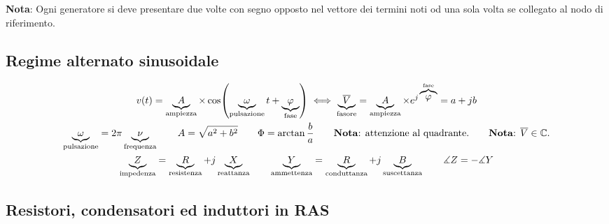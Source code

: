 \documentclass[10pt]{article}
\begin{document}
        \vspace{-\baselineskip}
        \textbf{Nota}: Ogni generatore si deve presentare due volte con segno opposto nel vettore dei termini noti od una sola volta
        se collegato al nodo di riferimento.

    \vspace{-\baselineskip}
    \subsection*{Regime alternato sinusoidale}
    \vspace{-1.5\baselineskip}

        \begin{gather*}
            v(t) = \underbrace{A}_{\text{ampiezza}} \times \cos (\underbrace{\omega}_{\text{pulsazione}} t + \underbrace{\varphi}_{\text{fase}}) \iff \underbrace{\overline{V}}_{\text{fasore}} = \underbrace{A}_{\text{ampiezza}} \times e^{j \overbrace{\varphi}^{\text{fase}}} = a + jb\\
            \underbrace{\omega}_{\text{pulsazione}} = 2 \pi \underbrace{\nu}_{\text{frequenza}} \qquad A = \sqrt{a^2 + b^2} \qquad \Phi = \arctan{\frac{b}{a}} \qquad \text{\textbf{Nota}: attenzione al quadrante.} \qquad \text{\textbf{Nota}: } \overline{V} \in \mathbb{C}.\\
            \underbrace{Z}_{\text{impedenza}} = \underbrace{R}_{\text{resistenza}} + j \underbrace{X}_{\text{reattanza}} \qquad \underbrace{Y}_{\text{ammettenza}} = \underbrace{R}_{\text{conduttanza}} + j \underbrace{B}_{\text{suscettanza}} \qquad \measuredangle Z = - \measuredangle Y
        \end{gather*}

    \vspace{-1.5\baselineskip}
    \subsection*{Resistori, condensatori ed induttori in RAS}
    \vspace{-1.5\baselineskip}
\end{document}
